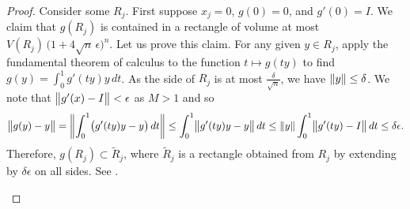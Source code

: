 \begin{proof}
Consider some $R_j$.
First suppose $x_j=0$, $g(0) = 0$, and $g'(0) = I$.
We claim that
$g(R_j)$ is contained in a 
rectangle of volume at most $V(R_j) \, {\bigl(1+4\sqrt{n} \, \epsilon\bigr)}^n$.
Let us prove this claim.
For any given $y \in R_j$,
apply the fundamental theorem of calculus
to the function $t \mapsto g(ty)$ to find
$g(y) = \int_0^1 g'(ty)y \,dt$.  As the
side of $R_j$ is at most $\frac{\delta}{\sqrt{n}}$,
we have $\lVert {y} \rVert \leq \delta$.
We note that $\bigl\lVert {g'(x)-I} \bigr\rVert < \epsilon$ as $M > 1$
and so
\begin{equation*}
\bigl\lVert {g(y)-y} \bigr\rVert
=
\left\lVert {\int_0^1 \bigl(g'(ty) y - y\bigr) \,dt} \right\rVert
\leq
\int_0^1 \bigl\lVert {g'(ty) y - y} \bigr\rVert \,dt
\leq
\lVert {y} \rVert \int_0^1 \bigl\lVert {g'(ty) - I} \bigr\rVert \,dt
\leq
\delta \epsilon .
\end{equation*}
Therefore, $g(R_j) \subset \widetilde{R}_j$, where
$\widetilde{R}_j$ is a rectangle obtained from
$R_j$ by extending by
$\delta \epsilon$ on all sides.  See .

\begin{myfigureht}
\caption{Image of $R_j$ under $g$ lies inside
$\widetilde{R}_j$.  A sample point $y \in R_j$ (on the boundary of $R_j$ in fact) is marked
and $g(y)$ must lie within with a radius of $\delta\epsilon$
(also marked).\label{changeofvarssq:fig}}
\end{myfigureht}



\end{proof}
